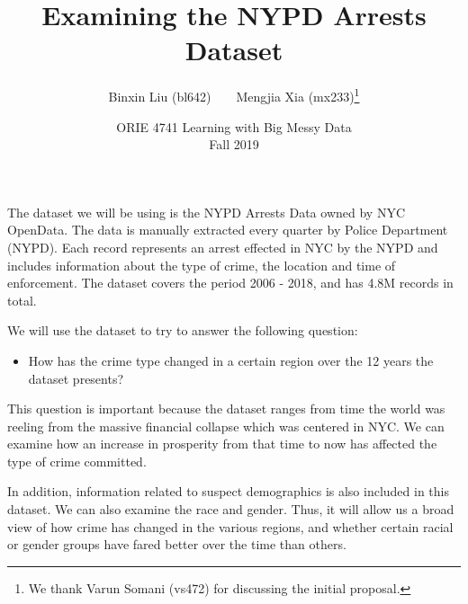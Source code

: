 \documentclass[letterpaper]{article}
\title{Examining the NYPD Arrests Dataset}
\author{Binxin Liu (bl642)~~~~Mengjia Xia (mx233)\footnote{We thank Varun Somani (vs472) for discussing the initial proposal.}}
\date{ORIE 4741 Learning with Big Messy Data\\ Fall 2019}
\begin{document}
\maketitle

The dataset we will be using is the NYPD Arrests Data \cite{NYPD} owned by NYC OpenData. The data is manually extracted every quarter by Police Department (NYPD). Each record represents an arrest effected in NYC by the NYPD and includes information about the type of crime, the location and time of enforcement. The dataset covers the period 2006 - 2018, and has 4.8M records in total.

We will use the dataset to try to answer the following question:
\begin{itemize}
    \item  How has the crime type changed in a certain region over the 12 years the dataset presents?
\end{itemize}

This question is important because the dataset ranges from time the world was reeling from the massive financial collapse which was centered in NYC. We can examine how an increase in prosperity from that time to now has affected the type of crime committed. 

In addition, information related to suspect demographics is also included in this dataset. We can also examine the race and gender. Thus, it will allow us a broad view of how crime has changed in the various regions, and whether certain racial or gender groups have fared better over the time than others. 





% 
{}
\end{document}
